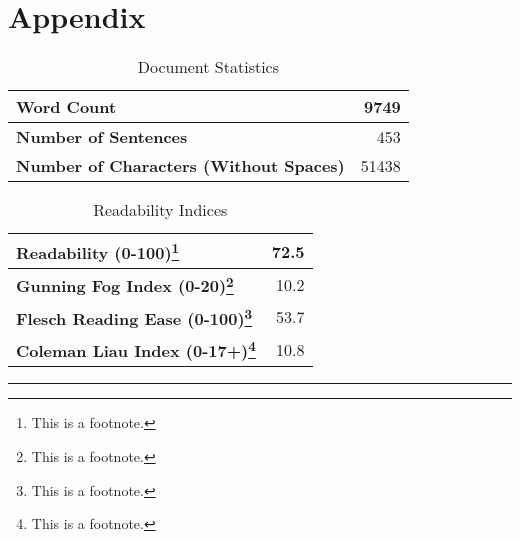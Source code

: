 \documentclass[table,french,english]{rapportCS}
\begin{document}
\newpage
\pagestyle{plain}

\section*{Appendix}\label{sec:appendix}
\begin{table}[h]
      \centering
      \begin{tabular}{|l|r|}
        \hline
        \textbf{Word Count} & 9749 \\
        \hline
        \textbf{Number of Sentences} & 453 \\
        \hline
        \textbf{Number of Characters (Without Spaces)} & 51438 \\
        \hline
      \end{tabular}
      \caption{Document Statistics}
      \label{tab:documentstats}
    \end{table}
    \begin{table}[h]
      \centering
      \begin{tabular}{|l|r|}
        \hline
        \textbf{Readability (0-100)\footnote{This is a footnote.}} & 72.5 \\
        \hline
        \textbf{Gunning Fog Index (0-20)\footnote{This is a footnote.}} & 10.2 \\
        \hline
        \textbf{Flesch Reading Ease (0-100)\footnote{This is a footnote.}} & 53.7 \\
        \hline
        \textbf{Coleman Liau Index (0-17+)\footnote{This is a footnote.}} & 10.8 \\
        \hline
      \end{tabular}
      \caption{Readability Indices}
      \label{tab:readability}
    \end{table}
\rule{\linewidth}{0.5pt}
\textbf{}\newline
\end{document}

